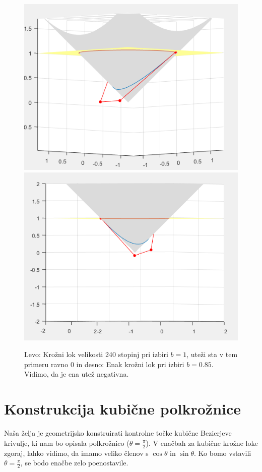 \documentclass[a4paper,12pt]{article}
\begin{document}
\begin{figure}[h]
\includegraphics[scale=0.45]{b1kot120.png}
\includegraphics[scale=0.45]{b085kot120.png}
\centering
\caption{Levo: Krožni lok velikosti 240 stopinj pri izbiri $b=1$, uteži sta v tem primeru ravno 0 in desno: Enak krožni lok pri izbiri $b=0.85$. Vidimo, da je ena utež negativna.}
\end{figure}

\section{Konstrukcija kubične polkrožnice}
Naša želja je geometrijsko konstruirati kontrolne točke kubične Bezierjeve krivulje, ki nam bo opisala polkrožnico ($\theta = \frac{\pi}{2}$). V enačbah za kubične krožne loke zgoraj, lahko vidimo, da imamo veliko členov s $\cos \theta$ in $\sin \theta$. Ko bomo vstavili $\theta=\frac{\pi}{2}$, se bodo enačbe zelo poenostavile. 
\end{document}
